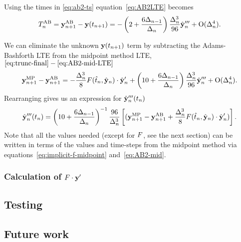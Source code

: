 Using the times in \eqref{eq:ab2-ts} equation~\eqref{eq:AB2LTE} becomes
\begin{equation}
  T_n^{\text{AB}} = \mathbf{y}_{n+1}^{\text{AB}} - \mathbf{y}(t_{n+1})
  = - \left( 2 + \frac{6 \Delta_{n-1}}{\Delta_{n}} \right) \frac{\Delta_{n}^3}{96} \hat{\mathbf{y}}_n'''
  + \text{O}(\Delta_{n}^4).
\label{eq:AB2-mid-LTE}
\end{equation}

We can eliminate the unknown $\mathbf{y}(t_{n+1})$ term by subtracting the Adams-Bashforth LTE from the midpoint method LTE, $\eqref{eq:trunc-final} - \eqref{eq:AB2-mid-LTE}$
\begin{equation}
 \mathbf{y}_{n+1}^{\text{MP}} - \mathbf{y}_{n+1}^{\text{AB}} =
  - \frac{\Delta_{n}^3}{8} F(\hat{t}_n, \hat{\mathbf{y}}_n) \cdot \hat{\mathbf{y}}_n'
  + \left( 10 + \frac{6 \Delta_{n-1}}{\Delta_{n}} \right) \frac{\Delta_{n}^3}{96} \hat{\mathbf{y}}_n'''
  + \text{O}(\Delta_{n}^4).
\end{equation}
Rearranging gives us an expression for $\hat{\mathbf{y}}_n'''(t_n)$
\begin{equation}
  \hat{\mathbf{y}}_n'''(t_n) =
  \left( 10 + \frac{6 \Delta_{n-1}}{\Delta_{n}} \right)^{-1} \frac{96}{\Delta_{n}^3}
  \left[
    (\mathbf{y}_{n+1}^{\text{MP}} - \mathbf{y}_{n+1}^{\text{AB}} + \frac{\Delta_{n}^3}{8} F(\hat{t}_n, \hat{\mathbf{y}}_n) \cdot \hat{\mathbf{y}}_n')
    \right].
\end{equation}
Note that all the values needed (except for $F$, see the next section) can be written in terms of the values and time-steps from the midpoint method via equations~\eqref{eq:implicit-f-midpoint} and~\eqref{eq:AB2-mid}.


\subsubsection{Calculation of $F \cdot \mathbf{y}'$}


\subsection{Testing}




\subsection{Future work}




